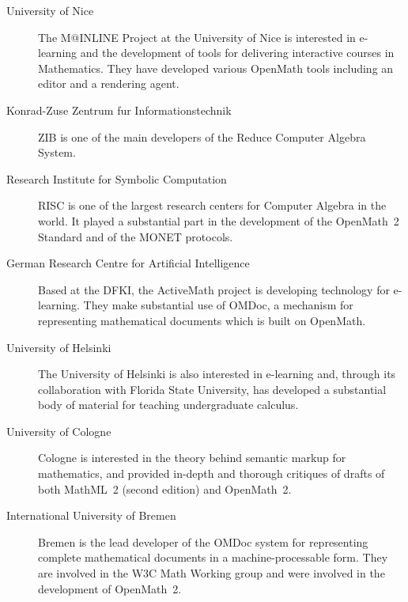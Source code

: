 \documentclass{euproposal}
\begin{document}
\begin{description}
 
\item[University of Nice] The M@INLINE Project at the University of
  Nice is interested in e-learning and the development of tools for
  delivering interactive courses in Mathematics.  They have developed
  various OpenMath tools including an editor and a rendering agent.
  
\item[Konrad-Zuse Zentrum fur Informationstechnik] ZIB is one of the
  main developers of the Reduce Computer Algebra System.

\item[Research Institute for Symbolic Computation] RISC is one of the
  largest research centers for Computer Algebra in the world.  It
  played a substantial part in the development of the OpenMath~2
  Standard and of the MONET protocols.
  
\item[German Research Centre for Artificial Intelligence] Based at the
  DFKI, the ActiveMath project is developing technology for
  e-learning.  They make substantial use of OMDoc, a mechanism for
  representing mathematical documents which is built on OpenMath.
  
\item[University of Helsinki] The University of Helsinki is also
  interested in e-learning and, through its collaboration with Florida
  State University, has developed a substantial body of material for
  teaching undergraduate calculus.
  
\item[University of Cologne] Cologne is interested in the theory
  behind semantic markup for mathematics, and provided in-depth and
  thorough critiques of drafts of both MathML~2 (second edition) and
  OpenMath~2.
  
\item[International University of Bremen] Bremen is the lead developer
  of the OMDoc system for representing complete mathematical documents
  in a machine-processable form.  They are involved in the W3C Math
  Working group and were involved in the development of OpenMath~2.

\end{description}
\end{document}
